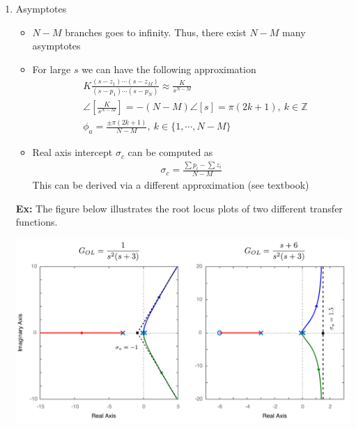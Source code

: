 \documentclass[twoside]{article}
\begin{document}
\begin{enumerate}
\item Asymptotes

\begin{itemize}
  \item $N-M$ branches goes to infinity. Thus, there exist $N-M$ many
    asymptotes
  \item For large $s$ we can have the following approximation
 \begin{align*}
  &K \frac{(s - z_1) \cdots (s - z_M)}{(s - p_1) \cdots (s - p_N)}
   \approx \frac{K}{s^{N-M}}
\\
&\angle \left[ \frac{K}{s^{N-M}} \right] = -(N-M) \angle [ s ] = \pi (2 k + 1), \ k \in \mathbb{Z} 
\\
&\phi_{a} = \frac{\pm \pi (2 k + 1)}{N-M}, \ k \in \lbrace 1, \cdots, N-M \rbrace
 \end{align*}
%
  \item Real axis intercept $\sigma_c$ can be computed as
 \begin{align*}
   \sigma_c = \frac{\sum p_i - \sum z_i}{N-M}
 \end{align*}
%
This can be derived via a different approximation (see textbook)
\end{itemize}

\newpage

\textbf{Ex:} The figure below illustrates the root locus plots
of two different transfer functions.

\begin{center}
\begin{minipage}[h]{0.9\linewidth}
    \begin{center}
      \includegraphics[width=\textwidth]{asm}
    \end{center}
\end{minipage}
\end{center}


\end{enumerate}
\end{document}
